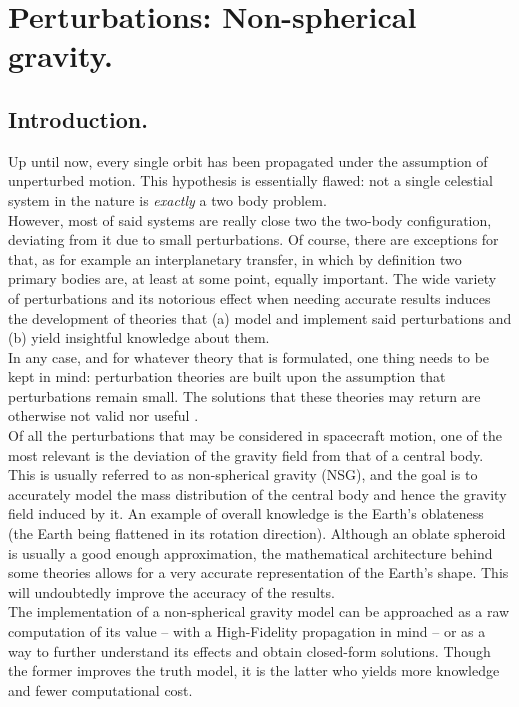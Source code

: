 \chapter{Perturbations: Non-spherical gravity.}
%
\label{chap:Chap_4}
%
\section{Introduction.}
%
\indent Up until now, every single orbit has been propagated under the assumption of unperturbed motion. This hypothesis is essentially flawed: not a single celestial system in the nature is \textit{exactly} a two body problem. \\
%
\indent However, most of said systems are really close two the two-body configuration, deviating from it due to small perturbations. Of course, there are exceptions for that, as for example an interplanetary transfer, in which by definition two primary bodies are, at least at some point, equally important. The wide variety of perturbations and its notorious effect when needing accurate results induces the development of theories that (a) model and implement said perturbations and (b) yield insightful knowledge about them. \\
%
\indent In any case, and for whatever theory that is formulated, one thing needs to be kept in mind: perturbation theories are built upon the assumption that perturbations remain small. The solutions that these theories may return are otherwise not valid nor useful \cite{Wiesel}. \\
%
\indent Of all the perturbations that may be considered in spacecraft motion, one of the most relevant is the deviation of the gravity field from that of a central body. This is usually referred to as non-spherical gravity (NSG), and the goal is to accurately model the mass distribution of the central body and hence the gravity field induced by it. An example of overall knowledge is the Earth's oblateness (\ie the Earth being flattened in its rotation direction). Although an oblate spheroid is usually a good enough approximation, the mathematical architecture behind some theories allows for a very accurate representation of the Earth's shape. This will undoubtedly improve the accuracy of the results. \\
%
\indent The implementation of a non-spherical gravity model can be approached as a raw computation of its value -- with a High-Fidelity propagation in mind -- or as a way to further understand its effects and obtain closed-form solutions. Though the former improves the truth model, it is the latter who yields more knowledge and fewer computational cost.\\
